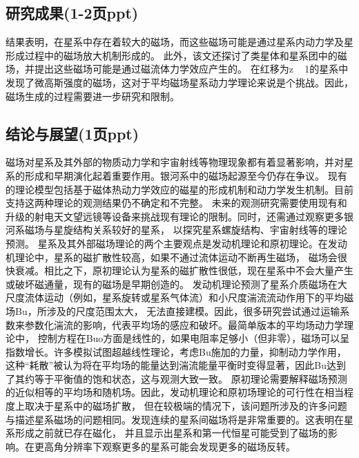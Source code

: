 \documentclass[12pt, a4paper, oneside]{ctexart}
\begin{document}
\begin{spacing}{2.0}
\section{研究成果(1-2页ppt)}
结果表明，在星系中存在着较大的磁场，而这些磁场可能是通过星系内动力学及星形成过程中的磁场放大机制形成的。
此外，该文还探讨了类星体和星系团中的磁场，并提出这些磁场可能是通过磁流体力学效应产生的。
在红移为z ~ 1的星系中发现了微高斯强度的磁场，这对于平均磁场星系动力学理论来说是个挑战。因此，磁场生成的过程需要进一步研究和限制。
\subsection{结论与展望(1页ppt)}
磁场对星系及其外部的物质动力学和宇宙射线等物理现象都有着显著影响，并对星系的形成和早期演化起着重要作用。银河系中的磁场起源至今仍存在争议。
现有的理论模型包括基于磁体热动力学效应的磁星的形成机制和动力学发生机制。目前支持这两种理论的观测结果仍不确定和不完整。
未来的观测研究需要使用现有和升级的射电天文望远镜等设备来挑战现有理论的限制。同时，还需通过观察更多银河系磁场与星旋结构关系较好的星系，
以探究星系螺旋结构、宇宙射线等的理论预测。
星系及其外部磁场理论的两个主要观点是发动机理论和原初理论。在发动机理论中，星系的磁扩散性较高，如果不通过流体运动不断再生磁场，
磁场会很快衰减。相比之下，原初理论认为星系的磁扩散性很低，现在星系中不会大量产生或破坏磁通量，现有的磁场是早期创造的。
发动机理论预测了星系介质磁场在大尺度流体运动（例如，星系旋转或星系气体流）和小尺度湍流流动作用下的平均磁场Bu，所涉及的尺度范围太大，
无法直接建模。因此，很多研究尝试通过运输系数来参数化湍流的影响，代表平均场的感应和破坏。最简单版本的平均场动力学理论中，
控制方程在Buo方面是线性的，如果电阻率足够小（但非零），磁场可以呈指数增长。许多模拟试图超越线性理论，考虑Bu施加的力量，抑制动力学作用，
这种“耗散”被认为将在平均场的能量达到湍流能量平衡时变得显著，因此Bu达到了其约等于平衡值的饱和状态，这与观测大致一致。
原初理论需要解释磁场预测的近似相等的平均场和随机场。因此，发动机理论和原初场理论的可行性在相当程度上取决于星系中的磁场扩散，
但在较极端的情况下，该问题所涉及的许多问题与描述星系磁场的问题相同。发现连续的星系间磁场将是非常重要的。这表明在星系形成之前就已存在磁化，
并且显示出星系和第一代恒星可能受到了磁场的影响。在更高角分辨率下观察更多的星系可能会发现更多的磁场反转。

\end{spacing}{}


\end{document}
